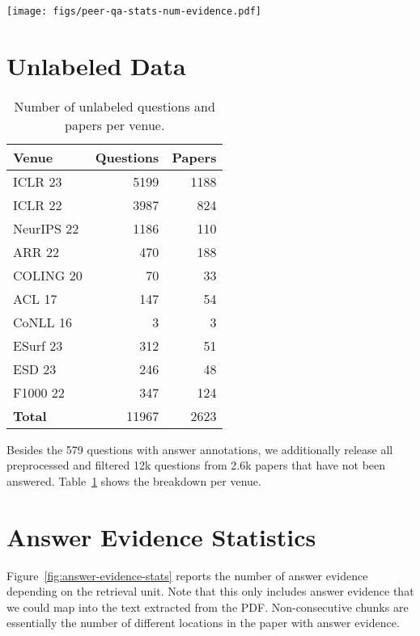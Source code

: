 \begin{figure*}[htpb]
    \centering
    \texttt{[image: figs/peer-qa-stats-num-evidence.pdf]}
    \caption{Number of evidence sentences (left), paragraphs (middle), and non-consecutive chunks (right) per question with annotated answer evidence.}
    \label{fig:answer-evidence-stats}
\end{figure*}

\section{Unlabeled Data}\label{sec:appendix-unlabeled-data}
\begin{table}[!h]
\small
\centering
\begin{tabular}{lrr}
\toprule
 Venue & Questions & Papers \\
\midrule
ICLR 23 & 5199 & 1188 \\
ICLR 22 & 3987 & 824 \\
NeurIPS 22 & 1186 & 110 \\
ARR 22 & 470 & 188 \\
COLING 20 & 70 & 33 \\
ACL 17 & 147 & 54 \\
CoNLL 16 & 3 & 3 \\
ESurf 23 & 312 & 51 \\
ESD 23 & 246 & 48 \\
F1000 22 & 347 & 124 \\
\midrule
\textbf{Total} & 11967 & 2623 \\
\bottomrule
\end{tabular}
\caption{Number of unlabeled questions and papers per venue.}
\label{tbl:appendix-unlabled-questions-count}
\end{table}


Besides the 579 questions with answer annotations, we additionally release all preprocessed and filtered 12k questions from 2.6k papers that have not been answered. Table~\ref{tbl:appendix-unlabled-questions-count} shows the breakdown per venue.


\section{Answer Evidence Statistics}\label{sec:appendix-answer-evidence-stats}
Figure~\ref{fig:answer-evidence-stats} reports the number of answer evidence depending on the retrieval unit. Note that this only includes answer evidence that we could map into the text extracted from the PDF. Non-consecutive chunks are essentially the number of different locations in the paper with answer evidence.

